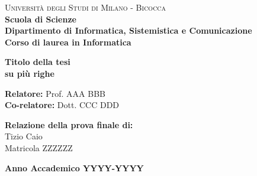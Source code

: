 \documentclass[a4paper,12pt]{report}
\begin{document}
    
    \begin{titlepage}
        
        \noindent
        \begin{minipage}[t]{0.18\textwidth}
        \end{minipage}
        \begin{minipage}[t]{0.82\textwidth}
        {
                {\textsc{Università degli Studi di Milano - Bicocca}} \\
                \textbf{Scuola di Scienze} \\
                \textbf{Dipartimento di Informatica, Sistemistica e Comunicazione} \\
                \textbf{Corso di laurea in Informatica} \\
                \par
        }
        \end{minipage}
        
	\vspace{40mm}
        
	\begin{center}
            {\LARGE{
                    \textbf{Titolo della tesi \\ su più righe}
                    \par
            }}
        \end{center}
        
        \vspace{50mm}

        \noindent
        {\large \textbf{Relatore:} Prof. AAA BBB } \\

        \noindent
        {\large \textbf{Co-relatore:} Dott. CCC DDD}
        
        \vspace{15mm}

        \begin{flushright}
            {\large \textbf{Relazione della prova finale di:}} \\
            \large{Tizio Caio} \\
            \large{Matricola ZZZZZZ} 
        \end{flushright}
        
        \vspace{40mm}
        \begin{center}
            {\large{\bf Anno Accademico YYYY-YYYY}}
        \end{center}
        
    \end{titlepage}
    
\end{document}
